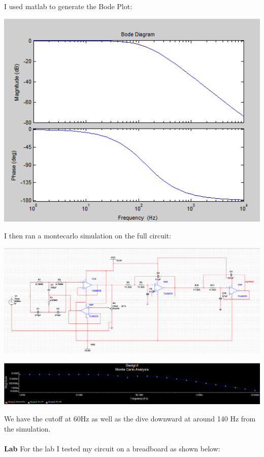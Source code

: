 \documentclass[12pt,letterpaper,boxed]{hmcpset}
\begin{document}
I used matlab to generate the Bode Plot:
\begin{center}
\includegraphics[scale=.75]{sallenKeys}
\end{center}
I then ran a montecarlo simulation on the full circuit:
\begin{center}
\includegraphics[scale=.5]{fullcircuit}
\end{center}
\begin{center}
\includegraphics[scale=.5]{FullMontecarlo}
\end{center}
We have the cutoff at 60Hz as well as the dive downward at around 140 Hz from the simulation.\\\\
\textbf{Lab}
For the lab I tested my circuit on a breadboard as shown below:
\end{document}
